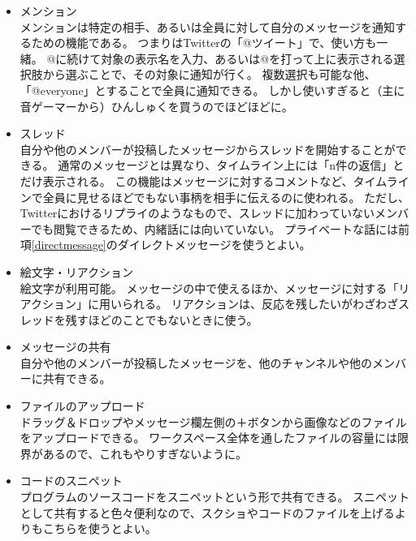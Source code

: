 \documentclass[lualatex,ja=standard,12pt,a4j]{bxjsbook}
\begin{document}
                \begin{itemize}
                	\item メンション\\
                    	メンションは特定の相手、あるいは全員に対して自分のメッセージを通知するための機能である。
                        つまりはTwitterの「@ツイート」で、使い方も一緒。
                        @に続けて対象の表示名を入力、あるいは@を打って上に表示される選択肢から選ぶことで、その対象に通知が行く。
                        複数選択も可能な他、「@everyone」とすることで全員に通知できる。
                        しかし使いすぎると（主に音ゲーマーから）ひんしゅくを買うのでほどほどに。
                    \item スレッド\\
                    	自分や他のメンバーが投稿したメッセージからスレッドを開始することができる。
                        通常のメッセージとは異なり、タイムライン上には「n件の返信」とだけ表示される。
                        この機能はメッセージに対するコメントなど、タイムラインで全員に見せるほどでもない事柄を相手に伝えるのに使われる。
                        ただし、Twitterにおけるリプライのようなもので、スレッドに加わっていないメンバーでも閲覧できるため、内緒話には向いていない。
                        プライベートな話には前項\ref{directmessage}のダイレクトメッセージを使うとよい。
                    \item 絵文字・リアクション\\
                    	絵文字が利用可能。
                        メッセージの中で使えるほか、メッセージに対する「リアクション」に用いられる。
                        リアクションは、反応を残したいがわざわざスレッドを残すほどのことでもないときに使う。
                    \item メッセージの共有\\
                    	自分や他のメンバーが投稿したメッセージを、他のチャンネルや他のメンバーに共有できる。
                    \item ファイルのアップロード\\
                    	ドラッグ＆ドロップやメッセージ欄左側の＋ボタンから画像などのファイルをアップロードできる。
                        ワークスペース全体を通したファイルの容量には限界があるので、これもやりすぎないように。
                    \item コードのスニペット\\
                    	プログラムのソースコードをスニペットという形で共有できる。
                        スニペットとして共有すると色々便利なので、スクショやコードのファイルを上げるよりもこちらを使うとよい。
                \end{itemize}
                
\end{document}
